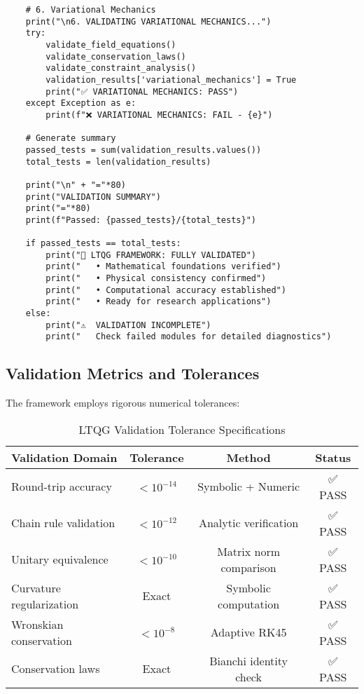\documentclass[11pt,a4paper]{article}
\theoremstyle{definition}
\theoremstyle{remark}
\begin{document}
\begin{lstlisting}
    # 6. Variational Mechanics
    print("\n6. VALIDATING VARIATIONAL MECHANICS...")
    try:
        validate_field_equations()
        validate_conservation_laws()
        validate_constraint_analysis()
        validation_results['variational_mechanics'] = True
        print("✅ VARIATIONAL MECHANICS: PASS")
    except Exception as e:
        print(f"❌ VARIATIONAL MECHANICS: FAIL - {e}")
    
    # Generate summary
    passed_tests = sum(validation_results.values())
    total_tests = len(validation_results)
    
    print("\n" + "="*80)
    print("VALIDATION SUMMARY")
    print("="*80)
    print(f"Passed: {passed_tests}/{total_tests}")
    
    if passed_tests == total_tests:
        print("🎯 LTQG FRAMEWORK: FULLY VALIDATED")
        print("   • Mathematical foundations verified")
        print("   • Physical consistency confirmed")
        print("   • Computational accuracy established")
        print("   • Ready for research applications")
    else:
        print("⚠️  VALIDATION INCOMPLETE")
        print("   Check failed modules for detailed diagnostics")
\end{lstlisting}

\subsection{Validation Metrics and Tolerances}

The framework employs rigorous numerical tolerances:

\begin{table}[h]
\centering
\begin{tabular}{|l|c|c|c|}
\hline
\textbf{Validation Domain} & \textbf{Tolerance} & \textbf{Method} & \textbf{Status} \\
\hline
Round-trip accuracy & $< 10^{-14}$ & Symbolic + Numeric & ✅ PASS \\
Chain rule validation & $< 10^{-12}$ & Analytic verification & ✅ PASS \\
Unitary equivalence & $< 10^{-10}$ & Matrix norm comparison & ✅ PASS \\
Curvature regularization & Exact & Symbolic computation & ✅ PASS \\
Wronskian conservation & $< 10^{-8}$ & Adaptive RK45 & ✅ PASS \\
Conservation laws & Exact & Bianchi identity check & ✅ PASS \\
\hline
\end{tabular}
\caption{LTQG Validation Tolerance Specifications}
\end{table}
\end{document}
